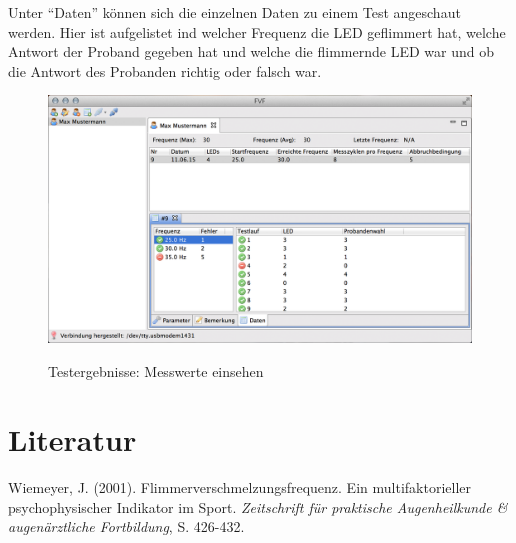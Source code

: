 \documentclass[11pt,accentcolor=tud2a,colorback,noheadingspace,bigchapter]{tudreport}
\begin{document}
Unter ``Daten'' können sich die einzelnen Daten zu einem Test angeschaut werden. Hier ist aufgelistet ind welcher Frequenz die LED geflimmert hat, welche Antwort der Proband gegeben hat und welche die flimmernde LED war und ob die Antwort des Probanden richtig oder falsch war.

\begin{figure}[H]
	\centering
	\includegraphics[width=\textwidth]{results_runs.png}
	\label{fig:results_runs}
	\caption{Testergebnisse: Messwerte einsehen}
\end{figure}



\chapter{Literatur}
\label{references::doc}\label{references:literatur}
Wiemeyer, J. (2001). Flimmerverschmelzungsfrequenz. Ein multifaktorieller psychophysischer Indikator im Sport. \emph{Zeitschrift für praktische Augenheilkunde \& augenärztliche Fortbildung}, S. 426-432.
\end{document}

